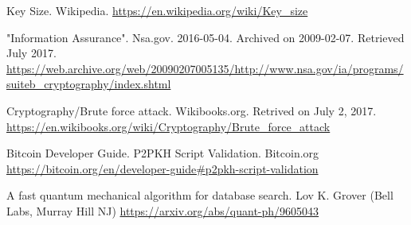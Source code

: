 \documentclass[11pt]{article}
\begin{document}
\begin{thebibliography}{7}
Key Size. Wikipedia.
\url{https://en.wikipedia.org/wiki/Key_size}

"Information Assurance". Nsa.gov. 2016-05-04. Archived on 2009-02-07. Retrieved July 2017.
\url{https://web.archive.org/web/20090207005135/http://www.nsa.gov/ia/programs/suiteb_cryptography/index.shtml}

Cryptography/Brute force attack. Wikibooks.org. Retrived on July 2, 2017.
\url{https://en.wikibooks.org/wiki/Cryptography/Brute_force_attack}

Bitcoin Developer Guide. P2PKH Script Validation. Bitcoin.org
\url{https://bitcoin.org/en/developer-guide#p2pkh-script-validation}

A fast quantum mechanical algorithm for database search. Lov K. Grover (Bell Labs, Murray Hill NJ)
\url{https://arxiv.org/abs/quant-ph/9605043}

\end{thebibliography}
\end{document}
